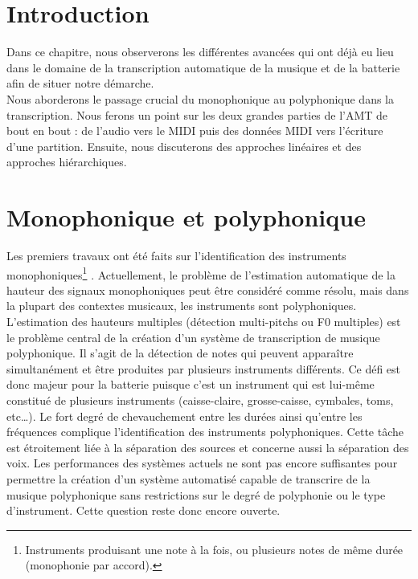 \section*{Introduction}
Dans ce chapitre, nous observerons les différentes avancées qui ont déjà eu lieu dans le domaine de la transcription automatique de la musique et de la batterie afin de situer notre démarche.\\
Nous aborderons le passage crucial du monophonique au polyphonique dans la transcription. Nous ferons un point sur les deux grandes parties de l’AMT de bout en bout : de l’audio vers le MIDI puis des données MIDI vers l’écriture d’une partition. Ensuite, nous discuterons des approches linéaires et des approches hiérarchiques.
\section{Monophonique et polyphonique}
Les premiers travaux ont été faits sur l’identification des instruments monophoniques\footnote{Instruments produisant une note à la fois, ou plusieurs notes de même durée (monophonie par accord).} \cite{future_directions}. Actuellement, le problème de l'estimation automatique de la hauteur des signaux monophoniques peut être considéré comme résolu, mais dans la plupart des contextes musicaux, les instruments sont polyphoniques. L'estimation des hauteurs multiples (détection multi-pitchs ou F0 multiples) est le problème central de la création d'un système de transcription de musique polyphonique. Il s’agit de la détection de notes qui peuvent apparaître simultanément et être produites par plusieurs instruments différents. Ce défi est donc majeur pour la batterie puisque c’est un instrument qui est lui-même constitué de plusieurs instruments (caisse-claire, grosse-caisse, cymbales, toms, etc…). Le fort degré de chevauchement entre les durées ainsi qu’entre les fréquences complique l’identification des instruments polyphoniques. Cette tâche est étroitement liée à la séparation des sources et concerne aussi la séparation des voix. Les performances des systèmes actuels ne sont pas encore suffisantes pour permettre la création d'un système automatisé capable de transcrire de la musique polyphonique sans restrictions sur le degré de polyphonie ou le type d'instrument. Cette question reste donc encore ouverte. 

